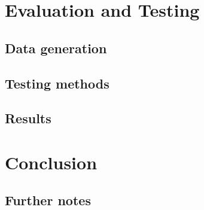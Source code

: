 \documentclass[11pt,a4paper]{vutinfth}
\begin{document}






\chapter{Evaluation and Testing}

\section{Data generation} %

\section{Testing methods}

\section{Results}

\chapter{Conclusion}

\section{Further notes}





\backmatter %



\end{document}
